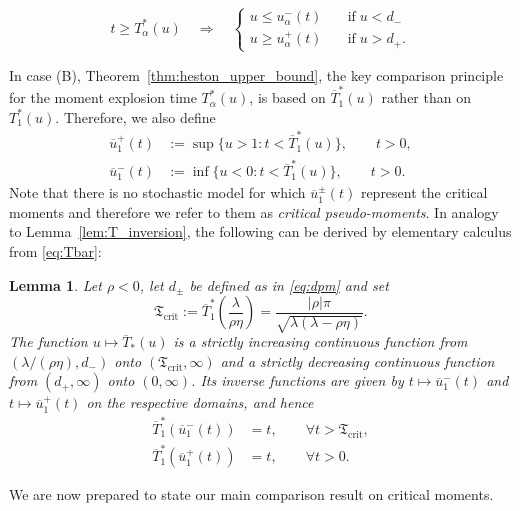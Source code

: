 \documentclass[12pt,a4paper]{amsart}
\numberwithin{equation}{section}
\numberwithin{equation}{section}
\newtheorem{lemma}[theorem]{Lemma}
\theoremstyle{nonumberplain}
\begin{document}
\begin{equation}\label{eq:implication_T}
t \ge T_\alpha^*(u) \quad \Longrightarrow \quad \begin{cases} u \le u_\alpha^-(t) &\quad \text{if} \; u < d_-\\ u \ge u_\alpha^+(t) &\quad \text{if} \; u > d_+.\end{cases}
\end{equation}

In case (B), Theorem~\ref{thm:heston_upper_bound}, the key comparison principle for the moment explosion time $T_\alpha^*(u)$, is based on $\overline T_1^*(u)$ rather than on $T_1^*(u)$. Therefore, we also define
\begin{align}
	 \overline u_1^+(t) &:= \sup\{u > 1: t < \overline T_1^*(u)\}, \qquad t>0, \\ 
	\overline u_1^-(t) &:= \inf\{u < 0: t < \overline T_1^*(u)\}, \qquad t>0.
\end{align}
Note that there is no stochastic model for which $\overline u_1^\pm(t)$ represent the critical moments and therefore we refer to them as \textit{critical pseudo-moments}. In analogy to Lemma~\ref{lem:T_inversion}, the following can be derived by elementary calculus from \eqref{eq:Tbar}:
\begin{lemma}
Let $\rho < 0$, let $d_\pm$ be defined as in \eqref{eq:dpm} and set
\begin{equation}\label{eq:Tfrak}
\mathfrak{T}_\text{crit} := \overline{T}_1^*\left(\frac{\lambda}{\rho \eta}\right)  = \frac{|\rho| \pi}{\sqrt{\lambda(\lambda - \rho \eta)}}.
\end{equation}
The function $u \mapsto \overline T_*(u)$ is a strictly increasing continuous function from $(\lambda/(\rho \eta),d_-)$ onto $(\mathfrak{T}_\text{crit},\infty)$ and a strictly decreasing continuous function from $(d_+,\infty)$ onto $(0,\infty)$. Its inverse functions are given by $t \mapsto \overline u_1^-(t)$ and $t \mapsto \overline u_1^+(t)$ on the respective domains, and hence
\begin{equation}\label{eq:explosion_critmom_relation_2}
\begin{split}
\overline T_1^*(\overline u_1^-(t)) &= t, \qquad \forall t > \mathfrak{T}_\text{crit},\\
\overline T_1^*(\overline u_1^+(t)) &= t, \qquad \forall t > 0.
\end{split}
\end{equation}
\end{lemma}

We are now prepared to state our main comparison result on critical moments.
\end{document}
